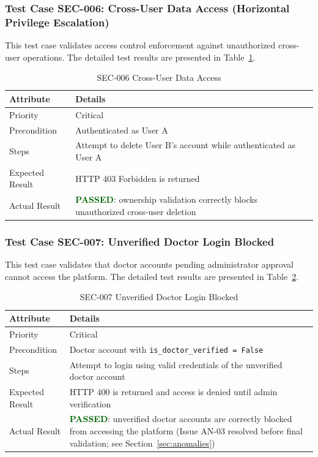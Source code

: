 \subsubsection{Test Case SEC-006: Cross-User Data Access (Horizontal Privilege Escalation)}

This test case validates access control enforcement against unauthorized cross-user operations. The detailed test results are presented in Table~\ref{tab:sec006}.

\begin{table}[H]
\centering
\caption{SEC-006 Cross-User Data Access}
\label{tab:sec006}
\renewcommand{\arraystretch}{1.3}

\begin{tabular}{|p{2cm}|p{13cm}|}
\hline
\rowcolor{red!10}
\textbf{Attribute} & \textbf{Details} \\
\hline
Priority & Critical \\
\hline
Precondition & Authenticated as User A \\
\hline
Steps & Attempt to delete User B's account while authenticated as User A \\
\hline
Expected Result & HTTP 403 Forbidden is returned \\
\hline
Actual Result & \textbf{\textcolor{darkgreen}{PASSED}}: ownership validation correctly blocks unauthorized cross-user deletion \\
\hline
\end{tabular}
\end{table}

\subsubsection{Test Case SEC-007: Unverified Doctor Login Blocked}

This test case validates that doctor accounts pending administrator approval cannot access the platform. The detailed test results are presented in Table~\ref{tab:sec007}.

\begin{table}[H]
\centering
\caption{SEC-007 Unverified Doctor Login Blocked}
\label{tab:sec007}
\renewcommand{\arraystretch}{1.3}

\begin{tabular}{|p{2cm}|p{13cm}|}
\hline
\rowcolor{red!10}
\textbf{Attribute} & \textbf{Details} \\
\hline
Priority & Critical \\
\hline
Precondition & Doctor account with \texttt{is\_doctor\_verified = False} \\
\hline
Steps & Attempt to login using valid credentials of the unverified doctor account \\
\hline
Expected Result & HTTP 400 is returned and access is denied until admin verification \\
\hline
Actual Result & \textbf{\textcolor{darkgreen}{PASSED}}: unverified doctor accounts are correctly blocked from accessing the platform (Issue AN-03 resolved before final validation; see Section~\ref{sec:anomalies}) \\
\hline
\end{tabular}
\end{table}

